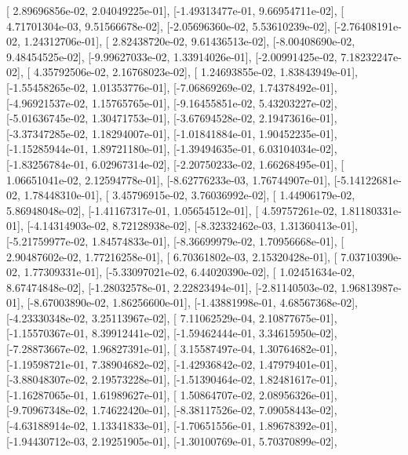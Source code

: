 \documentclass{article}
\begin{document}
       [ 2.89696856e-02,  2.04049225e-01],
       [-1.49313477e-01,  9.66954711e-02],
       [ 4.71701304e-03,  9.51566678e-02],
       [-2.05696360e-02,  5.53610239e-02],
       [-2.76408191e-02,  1.24312706e-01],
       [ 2.82438720e-02,  9.61436513e-02],
       [-8.00408690e-02,  9.48454525e-02],
       [-9.99627033e-02,  1.33914026e-01],
       [-2.00991425e-02,  7.18232247e-02],
       [ 4.35792506e-02,  2.16768023e-02],
       [ 1.24693855e-02,  1.83843949e-01],
       [-1.55458265e-02,  1.01353776e-01],
       [-7.06869269e-02,  1.74378492e-01],
       [-4.96921537e-02,  1.15765765e-01],
       [-9.16455851e-02,  5.43203227e-02],
       [-5.01636745e-02,  1.30471753e-01],
       [-3.67694528e-02,  2.19473616e-01],
       [-3.37347285e-02,  1.18294007e-01],
       [-1.01841884e-01,  1.90452235e-01],
       [-1.15285944e-01,  1.89721180e-01],
       [-1.39494635e-01,  6.03104034e-02],
       [-1.83256784e-01,  6.02967314e-02],
       [-2.20750233e-02,  1.66268495e-01],
       [ 1.06651041e-02,  2.12594778e-01],
       [-8.62776233e-03,  1.76744907e-01],
       [-5.14122681e-02,  1.78448310e-01],
       [ 3.45796915e-02,  3.76036992e-02],
       [ 1.44906179e-02,  5.86948048e-02],
       [-1.41167317e-01,  1.05654512e-01],
       [ 4.59757261e-02,  1.81180331e-01],
       [-4.14314903e-02,  8.72128938e-02],
       [-8.32332462e-03,  1.31360413e-01],
       [-5.21759977e-02,  1.84574833e-01],
       [-8.36699979e-02,  1.70956668e-01],
       [ 2.90487602e-02,  1.77216258e-01],
       [ 6.70361802e-03,  2.15320428e-01],
       [ 7.03710390e-02,  1.77309331e-01],
       [-5.33097021e-02,  6.44020390e-02],
       [ 1.02451634e-02,  8.67474848e-02],
       [-1.28032578e-01,  2.22823494e-01],
       [-2.81140503e-02,  1.96813987e-01],
       [-8.67003890e-02,  1.86256600e-01],
       [-1.43881998e-01,  4.68567368e-02],
       [-4.23330348e-02,  3.25113967e-02],
       [ 7.11062529e-04,  2.10877675e-01],
       [-1.15570367e-01,  8.39912441e-02],
       [-1.59462444e-01,  3.34615950e-02],
       [-7.28873667e-02,  1.96827391e-01],
       [ 3.15587497e-04,  1.30764682e-01],
       [-1.19598721e-01,  7.38904682e-02],
       [-1.42936842e-02,  1.47979401e-01],
       [-3.88048307e-02,  2.19573228e-01],
       [-1.51390464e-02,  1.82481617e-01],
       [-1.16287065e-01,  1.61989627e-01],
       [ 1.50864707e-02,  2.08956326e-01],
       [-9.70967348e-02,  1.74622420e-01],
       [-8.38117526e-02,  7.09058443e-02],
       [-4.63188914e-02,  1.13341833e-01],
       [-1.70651556e-01,  1.89678392e-01],
       [-1.94430712e-03,  2.19251905e-01],
       [-1.30100769e-01,  5.70370899e-02],
\end{document}
